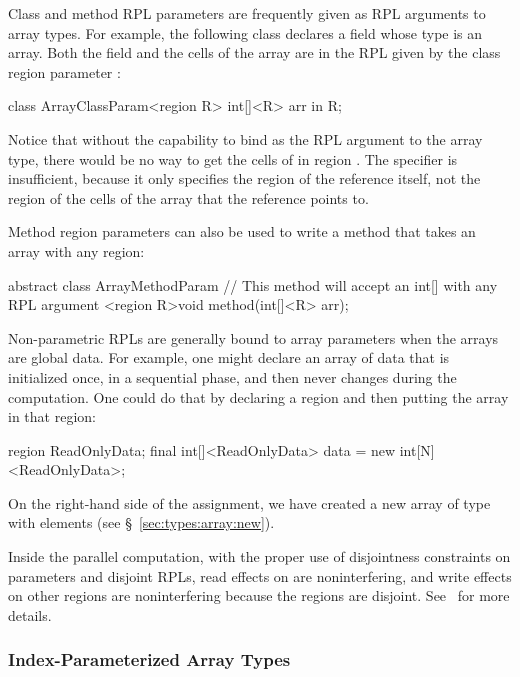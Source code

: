 Class and method RPL parameters are frequently given as RPL arguments
to array types.  For example, the following class declares a field
 whose type is an array.  Both the field  and the
cells of the array are in the RPL given by the class region parameter
:
%
\begin{dpjlisting}
class ArrayClassParam<region R> {
    int[]<R> arr in R;
}
\end{dpjlisting}
%
Notice that without the capability to bind  as the RPL argument
to the array type, there would be no way to get the cells of 
in region .  The specifier  is insufficient, because
it only specifies the region of the  reference itself, not
the region of the cells of the array that the reference points to.

Method region parameters can also be used to write a method that takes
an array with any region:
%
\begin{dpjlisting}
abstract class ArrayMethodParam {
    // This method will accept an int[] with any RPL argument
    <region R>void method(int[]<R> arr);
}
\end{dpjlisting}

Non-parametric RPLs are generally bound to array parameters when the
arrays are global data.  For example, one might declare an array of
data that is initialized once, in a sequential phase, and then never
changes during the computation.  One could do that by declaring a
region  and then putting the array in that region:
%
\begin{dpjlisting}
region ReadOnlyData;
final int[]<ReadOnlyData> data = new int[N]<ReadOnlyData>;
\end{dpjlisting}
%
On the right-hand side of the assignment, we have created a new array
of type  with  elements (see
\S~\ref{sec:types:array:new}).

Inside the parallel computation, with the proper use of disjointness
constraints on parameters and disjoint RPLs, read effects on
 are noninterfering, and write effects on other
regions are noninterfering because the regions are disjoint.  See
\tutorial\ for more details.


\subsubsection{Index-Parameterized Array Types%
\label{sec:types:array:ipa}}

